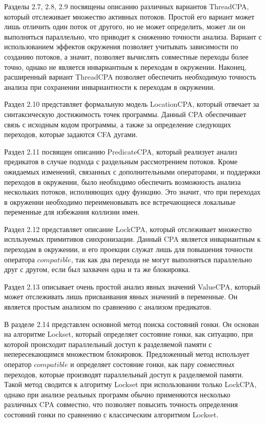 Разделы 2.7, 2.8, 2.9 посвящены описанию различных вариантов ThreadCPA, который отслеживает множество активных потоков.
Простой его вариант может лишь отличить один поток от другого, но не может определить, может ли он выполняться параллельно, что приводит к снижению точности анализа.
Вариант с использованием эффектов окружения позволяет учитывать зависимости по созданию потоков, а значит, позволяет вычислять совместные переходы более точно, однако не является инвариантным к переходам в окружении.
Наконец, расширенный вариант ThreadCPA позволяет обеспечить необходимую точность анализа при сохранении инвариантности к переходам в окружении.

Раздел 2.10 представляет формальную модель LocationCPA, который отвечает за синтаксическую достижимость точек программы.
Данный CPA обеспечивает связь с исходным кодом программы, а также за определение следующих переходов, которые задаются CFA дугами.

Раздел 2.11 посвящен описанию PredicateCPA, который реализует анализ предикатов в случае подхода с раздельным рассмотрением потоков.
Кроме ожидаемых изменений, связанных с дополнительными операторами, и поддержки переходов в окружении, было необходимо обеспечить возможность анализа нескольких потоков, исполняющих одну функцию. 
Это значит, что при переходах в окружении необходимо переименовывать все встречающиеся локальные переменные для избежания коллизии имен.

Раздел 2.12 представляет описание LockCPA, который отслеживает множество испльзуемых примитивов синхронизации.
Данный CPA является инвариантным к переходам в окружении, и его проекции служат лишь для повышения точности оператора $compatible$, так как два перехода не могут выполняться параллельно друг с другом, если был захвачен одна и та же блокировка.

Раздел 2.13 описывает очень простой анализ явных значений ValueCPA, который может отслеживать лишь присваивания явных значений в переменные.
Он является простым анализом по сравнению с анализом предикатов.

В разделе 2.14 представлен основной метод поиска состояний гонки. 
Он основан на алгоритме Lockset, который определяет состояние гонки, как ситуацию, при которой происходит параллельный доступ к разделяемой памяти с непересекающимся множеством блокировок.
Предложенный метод использует оператор $compatible$ и определяет состояние гонки, как пару \textit{совместных} переходов, которые производят параллельный доступ к разделяемой памяти.
Такой метод сводится к алгоритму Lockset при использовании только LockCPA, однако при анализе реальных программ обычно применяются несколько различных CPA совместно, что позволяет повысить точность определения состояний гонки по сравнению с классическим алгоритмом Lockset.

